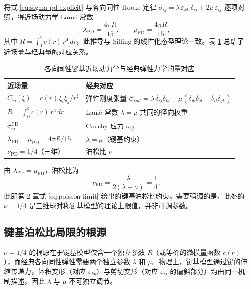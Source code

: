 将式 \eqref{eq:sigma-pd-explicit} 与各向同性 Hooke 定律 $\sigma_{ij}=\lambda\,\varepsilon_{kk}\,\delta_{ij}+2\mu\,\varepsilon_{ij}$ 逐项对照，得近场动力学 Lam\'e 常数
\begin{equation}
\label{eq:pd-lame}
\lambda_{\mathrm{PD}} = \frac{4\pi R}{15},\qquad \mu_{\mathrm{PD}} = \frac{4\pi R}{15},
\end{equation}
其中 $R=\int_0^\delta c(r)\,r^4\,dr$，此推导与 Silling \cite{Silling2010} 的线性化态型理论一致。表 \ref{tab:pd-ccm-correspond} 总结了近场量与经典量的对应关系。

\begin{table}[htbp]
\centering
\small
\caption{各向同性键基近场动力学与经典弹性力学的量对应}
\label{tab:pd-ccm-correspond}
\begin{tabular}{>{\raggedright\arraybackslash}p{}>{\raggedright\arraybackslash}p{}}
\toprule
近场量 & 经典对应 \\
\midrule
$C_{ij}(\xi)=c(r)\,\xi_i\xi_j/r^2$ & 弹性刚度张量 $\mathcal{C}_{ijkl}=\lambda\,\delta_{ij}\delta_{kl}+\mu(\delta_{ik}\delta_{jl}+\delta_{il}\delta_{jk})$ \\
$R=\int_0^\delta c(r)\,r^4\,dr$ & Lam\'e 常数 $\lambda=\mu$ 共同的径向权重 \\
$\sigma^{\mathrm{PD}}_{ij}$ & Cauchy 应力 $\sigma_{ij}$ \\
$\lambda_{\mathrm{PD}}=\mu_{\mathrm{PD}}=4\pi R/15$ & $\lambda=\mu$（键基约束） \\
$\nu_{\mathrm{PD}}=1/4$（三维） & 泊松比 $\nu$ \\
\bottomrule
\end{tabular}
\end{table}

由 $\lambda_{\mathrm{PD}}=\mu_{\mathrm{PD}}$，泊松比为
\begin{equation}
\label{eq:nu-1-4}
\nu_{\mathrm{PD}} = \frac{\lambda}{2(\lambda+\mu)} = \frac{1}{4},
\end{equation}
此即第 2 章式 \eqref{eq:poisson-limit} 给出的键基泊松比约束。需要强调的是，此处的 $\nu=1/4$ 是三维球对称键基模型的理论上限值，并非可调参数。

\subsection{键基泊松比局限的根源}
\label{subsec:poisson-root}

$\nu=1/4$ 的根源在于键基模型仅含一个独立参数 $R$（或等价的微模量函数 $c(r)$），而经典各向同性弹性需要两个独立参数 $\lambda$ 和 $\mu$。物理上，键基模型通过键的伸缩传递力，体积变形（对应 $\varepsilon_{kk}$）与剪切变形（对应 $\varepsilon_{ij}$ 的偏斜部分）均由同一机制描述，因此 $\lambda$ 与 $\mu$ 不可独立调节。

